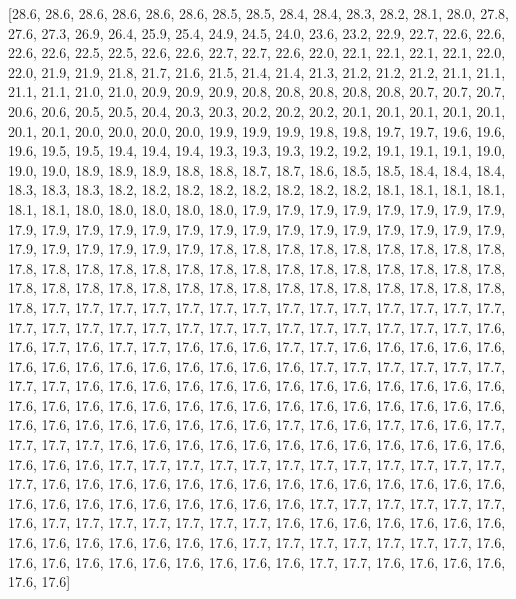 \documentclass[dvipsnames, svgnames,a4paper,11pt]{article}
\begin{document}
	[28.6, 28.6, 28.6, 28.6, 28.6, 28.6, 28.5, 28.5, 28.4, 28.4, 28.3, 28.2, 28.1, 28.0, 27.8, 27.6, 27.3, 26.9, 26.4, 25.9, 25.4, 24.9, 24.5, 24.0, 23.6, 23.2, 22.9, 22.7, 22.6, 22.6, 22.6, 22.6, 22.5, 22.5, 22.6, 22.6, 22.7, 22.7, 22.6, 22.0, 22.1, 22.1, 22.1, 22.1, 22.0, 22.0, 21.9, 21.9, 21.8, 21.7, 21.6, 21.5, 21.4, 21.4, 21.3, 21.2, 21.2, 21.2, 21.1, 21.1, 21.1, 21.1, 21.0, 21.0, 20.9, 20.9, 20.9, 20.8, 20.8, 20.8, 20.8, 20.8, 20.7, 20.7, 20.7, 20.6, 20.6, 20.5, 20.5, 20.4, 20.3, 20.3, 20.2, 20.2, 20.2, 20.1, 20.1, 20.1, 20.1, 20.1, 20.1, 20.1, 20.0, 20.0, 20.0, 20.0, 19.9, 19.9, 19.9, 19.8, 19.8, 19.7, 19.7, 19.6, 19.6, 19.6, 19.5, 19.5, 19.4, 19.4, 19.4, 19.3, 19.3, 19.3, 19.2, 19.2, 19.1, 19.1, 19.1, 19.0, 19.0, 19.0, 18.9, 18.9, 18.9, 18.8, 18.8, 18.7, 18.7, 18.6, 18.5, 18.5, 18.4, 18.4, 18.4, 18.3, 18.3, 18.3, 18.2, 18.2, 18.2, 18.2, 18.2, 18.2, 18.2, 18.2, 18.1, 18.1, 18.1, 18.1, 18.1, 18.1, 18.0, 18.0, 18.0, 18.0, 18.0, 17.9, 17.9, 17.9, 17.9, 17.9, 17.9, 17.9, 17.9, 17.9, 17.9, 17.9, 17.9, 17.9, 17.9, 17.9, 17.9, 17.9, 17.9, 17.9, 17.9, 17.9, 17.9, 17.9, 17.9, 17.9, 17.9, 17.9, 17.9, 17.9, 17.8, 17.8, 17.8, 17.8, 17.8, 17.8, 17.8, 17.8, 17.8, 17.8, 17.8, 17.8, 17.8, 17.8, 17.8, 17.8, 17.8, 17.8, 17.8, 17.8, 17.8, 17.8, 17.8, 17.8, 17.8, 17.8, 17.8, 17.8, 17.8, 17.8, 17.8, 17.8, 17.8, 17.8, 17.8, 17.8, 17.8, 17.8, 17.8, 17.8, 17.7, 17.7, 17.7, 17.7, 17.7, 17.7, 17.7, 17.7, 17.7, 17.7, 17.7, 17.7, 17.7, 17.7, 17.7, 17.7, 17.7, 17.7, 17.7, 17.7, 17.7, 17.7, 17.7, 17.7, 17.7, 17.7, 17.7, 17.7, 17.6, 17.6, 17.7, 17.6, 17.7, 17.7, 17.6, 17.6, 17.6, 17.7, 17.7, 17.6, 17.6, 17.6, 17.6, 17.6, 17.6, 17.6, 17.6, 17.6, 17.6, 17.6, 17.6, 17.6, 17.6, 17.7, 17.7, 17.7, 17.7, 17.7, 17.7, 17.7, 17.7, 17.6, 17.6, 17.6, 17.6, 17.6, 17.6, 17.6, 17.6, 17.6, 17.6, 17.6, 17.6, 17.6, 17.6, 17.6, 17.6, 17.6, 17.6, 17.6, 17.6, 17.6, 17.6, 17.6, 17.6, 17.6, 17.6, 17.6, 17.6, 17.6, 17.6, 17.6, 17.6, 17.6, 17.6, 17.6, 17.6, 17.7, 17.6, 17.6, 17.7, 17.6, 17.6, 17.7, 17.7, 17.7, 17.7, 17.6, 17.6, 17.6, 17.6, 17.6, 17.6, 17.6, 17.6, 17.6, 17.6, 17.6, 17.6, 17.6, 17.6, 17.6, 17.7, 17.7, 17.7, 17.7, 17.7, 17.7, 17.7, 17.7, 17.7, 17.7, 17.7, 17.7, 17.7, 17.6, 17.6, 17.6, 17.6, 17.6, 17.6, 17.6, 17.6, 17.6, 17.6, 17.6, 17.6, 17.6, 17.6, 17.6, 17.6, 17.6, 17.6, 17.6, 17.6, 17.6, 17.6, 17.6, 17.7, 17.7, 17.7, 17.7, 17.7, 17.7, 17.6, 17.7, 17.7, 17.7, 17.7, 17.7, 17.7, 17.7, 17.6, 17.6, 17.6, 17.6, 17.6, 17.6, 17.6, 17.6, 17.6, 17.6, 17.6, 17.6, 17.6, 17.6, 17.7, 17.7, 17.7, 17.7, 17.7, 17.7, 17.7, 17.6, 17.6, 17.6, 17.6, 17.6, 17.6, 17.6, 17.6, 17.6, 17.6, 17.7, 17.7, 17.6, 17.6, 17.6, 17.6, 17.6, 17.6]
	
\end{document}
